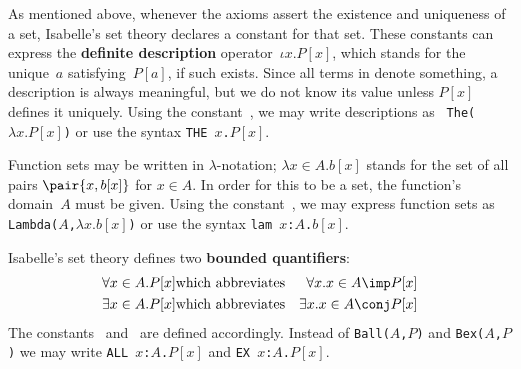 As mentioned above, whenever the axioms assert the existence and uniqueness
of a set, Isabelle's set theory declares a constant for that set.  These
constants can express the {\bf definite description} operator~$\iota
x.P[x]$, which stands for the unique~$a$ satisfying~$P[a]$, if such exists.
Since all terms in {\ZF} denote something, a description is always
meaningful, but we do not know its value unless $P[x]$ defines it uniquely.
Using the constant~, we may write descriptions as {\tt
  The($\lambda x.P[x]$)} or use the syntax \hbox{\tt THE $x$.$P[x]$}.

Function sets may be written in $\lambda$-notation; $\lambda x\in A.b[x]$
stands for the set of all pairs $\pair{x,b[x]}$ for $x\in A$.  In order for
this to be a set, the function's domain~$A$ must be given.  Using the
constant~, we may express function sets as {\tt
Lambda($A$,$\lambda x.b[x]$)} or use the syntax \hbox{\tt lam $x$:$A$.$b[x]$}.

Isabelle's set theory defines two {\bf bounded quantifiers}:
\begin{eqnarray*}
   \forall x\in A.P[x] &\hbox{which abbreviates}& \forall x. x\in A\imp P[x] \\
   \exists x\in A.P[x] &\hbox{which abbreviates}& \exists x. x\in A\conj P[x]
\end{eqnarray*}
The constants~ and~ are defined
accordingly.  Instead of {\tt Ball($A$,$P$)} and {\tt Bex($A$,$P$)} we may
write
\hbox{\tt ALL $x$:$A$.$P[x]$} and \hbox{\tt EX $x$:$A$.$P[x]$}.



